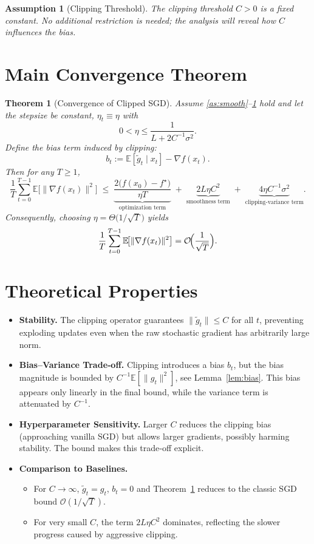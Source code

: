 \documentclass{article}
\newtheorem{theorem}{Theorem}
\newtheorem{assumption}{Assumption}
\newcommand{\E}{\mathbb{E}}
\begin{document}
\begin{assumption}[Clipping Threshold]\label{as:clip}
The clipping threshold $C>0$ is a fixed constant. No additional restriction is needed; the analysis will reveal how $C$ influences the bias.
\end{assumption}

\section*{Main Convergence Theorem}
\begin{theorem}[Convergence of Clipped SGD]\label{thm:main}
Assume \ref{as:smooth}--\ref{as:clip} hold and let the stepsize be constant,
$\eta_{t}\equiv\eta$ with
\[
0<\eta\le\frac{1}{L+2C^{-1}\sigma^{2}} .
\]
Define the bias term induced by clipping:
\[
b_{t}:= \E[\tilde g_{t}\mid x_{t}]-\nabla f(x_{t}) .
\]
Then for any $T\ge1$,
\[
\frac{1}{T}\sum_{t=0}^{T-1}\E\!\bigl[\|\nabla f(x_{t})\|^{2}\bigr]
\;\le\;
\underbrace{\frac{2\bigl(f(x_{0})-f^{\star}\bigr)}{\eta T}}_{\text{optimization term}}
\;+\;
\underbrace{2L\eta C^{2}}_{\text{smoothness term}}
\;+\;
\underbrace{4\eta C^{-1}\sigma^{2}}_{\text{clipping‑variance term}} .
\]
Consequently, choosing $\eta=\Theta\!\bigl(1/\sqrt{T}\bigr)$ yields
\[
\frac{1}{T}\sum_{t=0}^{T-1}\E\!\bigl[\|\nabla f(x_{t})\|^{2}\bigr]=\mathcal{O}\!\Bigl(\frac{1}{\sqrt{T}}\Bigr).
\]
\end{theorem}

\section*{Theoretical Properties}
\begin{itemize}
    \item \textbf{Stability.} The clipping operator guarantees $\|\tilde g_{t}\|\le C$ for all $t$, preventing exploding updates even when the raw stochastic gradient has arbitrarily large norm.
    \item \textbf{Bias–Variance Trade‑off.} Clipping introduces a bias $b_{t}$, but the bias magnitude is bounded by $C^{-1}\E[\|g_{t}\|^{2}]$, see Lemma~\ref{lem:bias}. This bias appears only linearly in the final bound, while the variance term is attenuated by $C^{-1}$.
    \item \textbf{Hyperparameter Sensitivity.} Larger $C$ reduces the clipping bias (approaching vanilla SGD) but allows larger gradients, possibly harming stability. The bound makes this trade‑off explicit.
    \item \textbf{Comparison to Baselines.}
    \begin{itemize}
        \item For $C\to\infty$, $\tilde g_{t}=g_{t}$, $b_{t}=0$ and Theorem~\ref{thm:main} reduces to the classic SGD bound $\mathcal{O}(1/\sqrt{T})$.
        \item For very small $C$, the term $2L\eta C^{2}$ dominates, reflecting the slower progress caused by aggressive clipping.
    \end{itemize}
\end{itemize}
\end{document}
